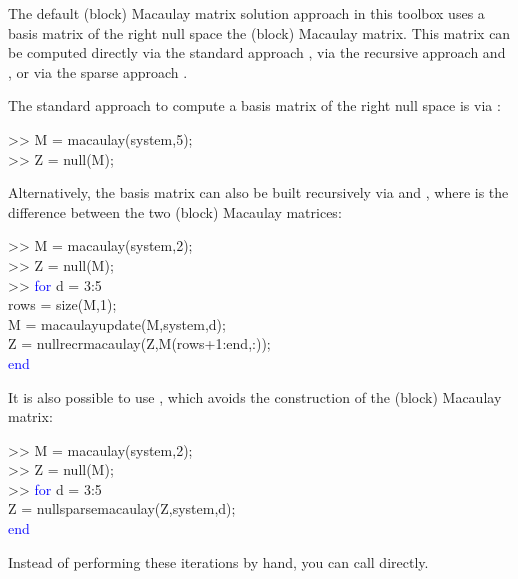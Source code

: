 \documentclass{manual}
\begin{document}
            The default (block) Macaulay matrix solution approach in this toolbox uses a basis matrix of the right null space the (block) Macaulay matrix.
            This matrix can be computed directly via the standard approach , via the recursive approach  and , or via the sparse approach .
            \begin{code}
                The standard approach to compute a basis matrix of the right null space is via :
                \begin{codeblock}
                    >> M = macaulay(system,5); \\
                    >> Z = null(M);
                \end{codeblock}
                \noindent Alternatively, the basis matrix can also be built recursively via  and , where  is the difference between the two (block) Macaulay matrices:
                \begin{codeblock}
                    >> M = macaulay(system,2); \\
                    >> Z = null(M); \\
                    >> \textcolor{blue}{for} d = 3:5 \\
                    \tabfor \tab rows = size(M,1); \\
                    \tabfor \tab M = macaulayupdate(M,system,d); \\
                    \tabfor \tab Z = nullrecrmacaulay(Z,M(rows+1:end,:)); \\
                    \tabfor \textcolor{blue}{end}
                \end{codeblock}
                \noindent It is also possible to use , which avoids the construction of the (block) Macaulay matrix:
                \begin{codeblock}
                    >> M = macaulay(system,2); \\
                    >> Z = null(M); \\
                    >> \textcolor{blue}{for} d = 3:5 \\
                    \tabfor \tab Z = nullsparsemacaulay(Z,system,d); \\
                    \tabfor \textcolor{blue}{end}
                \end{codeblock}
            \end{code}
            Instead of performing these iterations by hand, you can call  directly.
\end{document}
